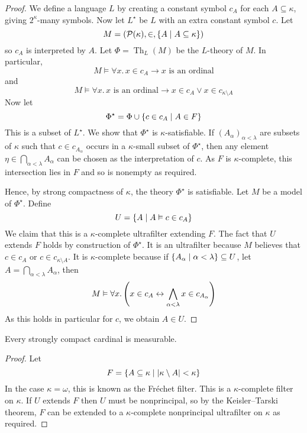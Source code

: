 \begin{proof}
    We define a language \( L \) by creating a constant symbol \( c_A \) for each \( A \subseteq \kappa \), giving \( 2^\kappa \)-many symbols.
    Now let \( L^\star \) be \( L \) with an extra constant symbol \( c \).
    Let
    \[ M = (\mathcal P(\kappa), \in, \qty{A \mid A \subseteq \kappa}) \]
    so \( c_A \) is interpreted by \( A \).
    Let \( \Phi = \operatorname{Th}_L(M) \) be the \( L \)-theory of \( M \).
    In particular,
    \[ M \vDash \forall x.\, x \in c_A \to x \text{ is an ordinal} \]
    and
    \[ M \vDash \forall x.\, x \text{ is an ordinal} \to x \in c_A \vee x \in c_{\kappa \setminus A} \]
    Now let
    \[ \Phi^\star = \Phi \cup \qty{c \in c_A \mid A \in F} \]
    This is a subset of \( L^\star \).
    We show that \( \Phi^\star \) is \( \kappa \)-satisfiable.
    If \( (A_\alpha)_{\alpha < \lambda} \) are subsets of \( \kappa \) such that \( c \in c_{A_\alpha} \) occurs in a \( \kappa \)-small subset of \( \Phi^\star \), then any element \( \eta \in \bigcap_{\alpha < \lambda} A_\alpha \) can be chosen as the interpretation of \( c \).
    As \( F \) is \( \kappa \)-complete, this intersection lies in \( F \) and so is nonempty as required.

    Hence, by strong compactness of \( \kappa \), the theory \( \Phi^\star \) is satisfiable.
    Let \( M \) be a model of \( \Phi^\star \).
    Define
    \[ U = \qty{A \mid A \vDash c \in c_A} \]
    We claim that this is a \( \kappa \)-complete ultrafilter extending \( F \).
    The fact that \( U \) extends \( F \) holds by construction of \( \Phi^\star \).
    It is an ultrafilter because \( M \) believes that \( c \in c_A \) or \( c \in c_{\kappa \setminus A} \).
    It is \( \kappa \)-complete because if \( \qty{A_\alpha \mid \alpha < \lambda} \subseteq U \), let \( A = \bigcap_{\alpha < \lambda} A_\alpha \), then
    \[ M \vDash \forall x.\, \qty(x \in c_A \leftrightarrow \bigwedge_{\alpha < \lambda} x \in c_{A_\alpha}) \]
    As this holds in particular for \( c \), we obtain \( A \in U \).
\end{proof}
\begin{corollary}
    Every strongly compact cardinal is measurable.
\end{corollary}
\begin{proof}
    Let
    \[ F = \qty{A \subseteq \kappa \mid \abs{\kappa\setminus A} < \kappa} \]
    In the case \( \kappa = \omega \), this is known as the Fr\'echet filter.
    This is a \( \kappa \)-complete filter on \( \kappa \).
    If \( U \) extends \( F \) then \( U \) must be nonprincipal, so by the Keisler--Tarski theorem, \( F \) can be extended to a \( \kappa \)-complete nonprincipal ultrafilter on \( \kappa \) as required.
\end{proof}
